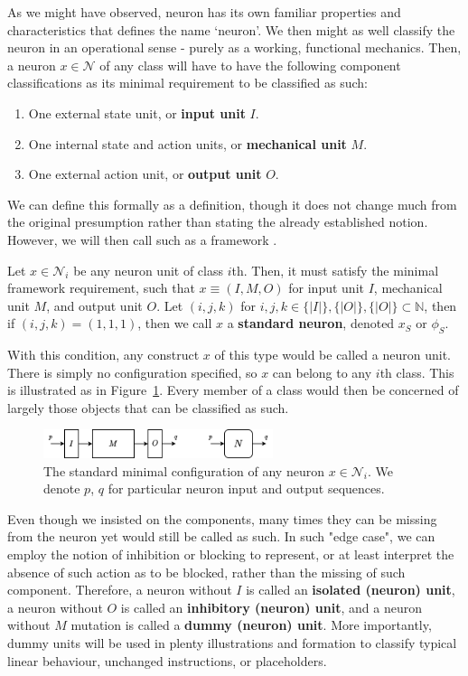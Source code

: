 As we might have observed, neuron has its own familiar properties and characteristics that defines the name `neuron'. We then might as well classify the neuron in an operational sense - purely as a working, functional mechanics. Then, a neuron $x\in \mathcal{N}$ of any class will have to have the following component classifications as its minimal requirement to be classified as such: 
\begin{enumerate}[topsep=1pt,itemsep=0.5pt,leftmargin=18pt]
    \item One external state unit, or \textbf{input unit} $I$. 
    \item One internal state and action units, or \textbf{mechanical unit} $M$. 
    \item One external action unit, or \textbf{output unit} $O$. 
\end{enumerate}
We can define this formally as a definition, though it does not change much from the original presumption rather than stating the already established notion. However, we will then call such as a framework .
\begin{definition}
    Let $x\in \mathcal{N}_{i}$ be any neuron unit of class $i$th. Then, it must satisfy the minimal framework requirement, such that $x\equiv (I,M,O)$ for input unit $I$, mechanical unit $M$, and output unit $O$. Let $(i,j,k)$ for $i,j,k\in \{|I|\},\{|O|\},\{|O|\}\subset \mathbb{N}$, then if $(i,j,k)=(1,1,1)$, then we call $x$ a \textbf{standard neuron}, denoted $x_{S}$ or $\phi_{S}$. 
\end{definition}
With this condition, any construct $x$ of this type would be called a neuron unit. There is simply no configuration specified, so $x$ can belong to any $i$th class. This is illustrated as in Figure~\ref{fig:nn1}. Every member of a class would then be concerned of largely those objects that can be classified as such. 
\begin{figure}[htb]
    \centering
    \includegraphics[width=0.6\textwidth]{img/nn1.png}
    \caption{The standard minimal configuration of any neuron $x\in \mathcal{N}_{i}$. We denote $p$, $q$ for particular neuron input and output sequences.}
    \label{fig:nn1}
\end{figure}

Even though we insisted on the components, many times they can be missing from the neuron yet would still be called as such. In such "edge case", we can employ the notion of inhibition or blocking to represent, or at least interpret the absence of such action as to be blocked, rather than the missing of such component. Therefore, a neuron without $I$ is called an \textbf{isolated (neuron) unit}, a neuron without $O$ is called an \textbf{inhibitory (neuron) unit}, and a neuron without $M$ mutation is called a \textbf{dummy (neuron) unit}. More importantly, dummy units will be used in plenty illustrations and formation to classify typical linear behaviour, unchanged instructions, or placeholders. 

